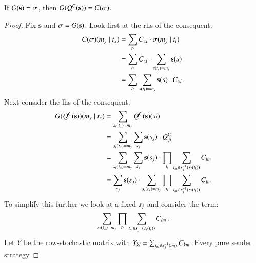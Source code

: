 \documentclass[fleqn,reqno,10pt]{article}
\renewcommand{\Smixed}{\ensuremath{\mathrm{\mathbf{s}}}}
\begin{document}
\medskip



\medskip

\begin{theorem}
  \label{thm:sender-eq}
  If $G(\Smixed) = \Sstrat$, then $G(Q^C(\Smixed)) = C(\Sstrat)$.
\end{theorem}




\begin{proof}
  Fix $\Smixed$ and $\Sstrat = G(\Smixed)$. Look first at the rhs of
  the consequent:
  \begin{align*}
    C(\Sstrat)(\messg_y \probbar \state_x) & =  \sum_{\state_l} C_{xl}
    \cdot \Sstrat(\messg_y \probbar \state_l) \\
    & =  \sum_{\state_l} C_{xl}
    \cdot  \sum_{\Spure(\state_l) = \messg_y} \Smixed(\Spure) \\
    & = \sum_{\state_l}
    \sum_{\Spure(\state_l) = \messg_y} \Smixed(\Spure) \cdot C_{xl}\,.
  \end{align*}
  Next consider the lhs of the consequent:
  \begin{align*}
    G(Q^C(\Smixed))(\messg_y \probbar \state_x) & =
    \sum_{\Spure_i(\state_x)=\messg_y} Q^C(\Smixed)(\Spure_i) \\
    & = \sum_{\Spure_i(\state_x)=\messg_y} \sum_{\Spure_j}
    \Smixed(\Spure_j) \cdot Q^C_{ji} \\
    & = \sum_{\Spure_i(\state_x)=\messg_y} \sum_{\Spure_j}
    \Smixed(\Spure_j) \cdot \prod_{\state_l} \sum_{\state_m \in
      \Spure_j^{-1}(\Spure_i(\state_l))} C_{lm} \\
    & = \sum_{\Spure_j} \Smixed(\Spure_j) \cdot
    \sum_{\Spure_i(\state_x)=\messg_y} \prod_{\state_l}
    \sum_{\state_m \in \Spure_j^{-1}(\Spure_i(\state_l))} C_{lm}
  \end{align*}
  To simplify this further we look at a fixed $s_j$ and consider
  the term: 
  \begin{align}
    \label{eq:term}
    \sum_{s_i(t_x)=m_y} \prod_{t_l} \sum_{t_m
      \in s_j^{-1}(s_i(t_l))} C_{lm}\,.
  \end{align}
  Let $Y$ be the row-stochastic matrix with $Y_{kl} = \sum_{t_m
    \in s_j^{-1}(m_l)} C_{km}$. Every pure sender strategy

\end{proof}
\end{document}
